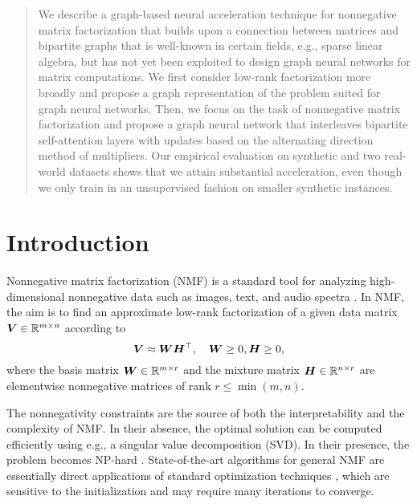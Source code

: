 \documentclass{article}
\begin{document}
\begin{abstract}
We describe a graph-based neural acceleration technique for nonnegative matrix factorization that builds upon a connection between matrices and bipartite graphs that is well-known in certain fields, e.g., sparse linear algebra, but has not yet been exploited to design graph neural networks for matrix computations. We first consider low-rank factorization more broadly and propose a graph representation of the problem suited for graph neural networks. Then, we focus on the task of nonnegative matrix factorization and propose a graph neural network that interleaves bipartite self-attention layers with updates based on the alternating direction method of multipliers. Our empirical evaluation on synthetic and two real-world datasets shows that we attain substantial acceleration, even though we only train in an unsupervised fashion on smaller synthetic instances. %

\end{abstract}

\section{Introduction}
Nonnegative matrix factorization (NMF) is a standard tool for analyzing high-dimensional nonnegative data such as images, text, and audio spectra \citep{Fu2019, Gillis2020}. In NMF, the aim is to find an approximate low-rank factorization of a given data matrix ${\bm{V}}\in\mathbb{R}^{m\times n}$ according to
\begin{equation}
    {\bm{V}}\approx {\bm{W}}{\bm{H}}^\top, \quad {\bm{W}}\geq 0, {\bm{H}}\geq 0,
\end{equation}
where the basis matrix ${\bm{W}}\in\mathbb{R}^{m\times r}$ and the mixture matrix ${\bm{H}}\in\mathbb{R}^{n\times r}$ are elementwise nonnegative matrices of rank $r\leq\min(m,n)$. 

The nonnegativity constraints are the source of both the interpretability and the complexity of NMF. In their absence, the optimal solution can be computed efficiently using e.g., a singular value decomposition (SVD). In their presence, the problem becomes NP-hard \citep{Vavasis2010}. State-of-the-art algorithms for general NMF are essentially direct applications of standard optimization techniques \citep{Huang2016,Gillis2020}, which are sensitive to the initialization and may require many iterations to converge.
\end{document}
